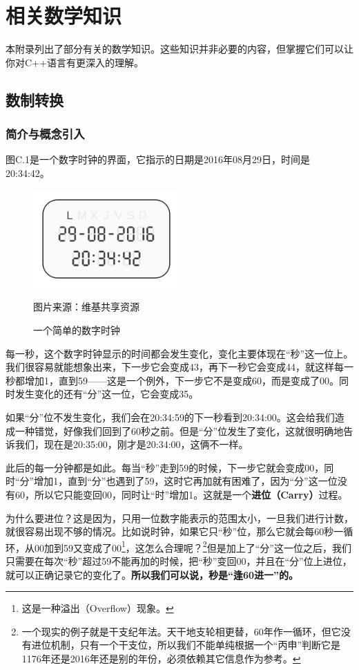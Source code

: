\chapter{相关数学知识}
本附录列出了部分有关的数学知识。这些知识并非必要的内容，但掌握它们可以让你对C++语言有更深入的理解。
\section{数制转换}
\subsection*{简介与概念引入}
图C.1是一个数字时钟的界面，它指示的日期是2016年08月29日，时间是20:34:42。\par
\begin{figure}[htbp]
    \centering
    \includegraphics[width=0.5\textwidth]{../images/other_parts/C_digital_clock.png}
    \caption{一个简单的数字时钟}
    \footnotesize{图片来源：维基共享资源}
\end{figure}
每一秒，这个数字时钟显示的时间都会发生变化，变化主要体现在``秒''这一位上。我们很容易就能想象出来，下一步它会变成43，再下一秒它会变成44，就这样每一秒都增加1，直到59——这是一个例外，下一步它不是变成60，而是变成了00。同时发生变化的还有``分''这一位，它会变成35。\par
如果``分''位不发生变化，我们会在20:34:59的下一秒看到20:34:00。这会给我们造成一种错觉，好像我们回到了60秒之前。但是``分''位发生了变化，这就很明确地告诉我们，现在是20:35:00，刚才是20:34:00，这俩不一样。\par
此后的每一分钟都是如此。每当``秒''走到59的时候，下一步它就会变成00，同时``分''增加1，直到``分''也遇到了59，这时它再加就有困难了，因为``分''这一位没有60，所以它只能变回00，同时让``时''增加1。这就是一个\textbf{进位（Carry）}过程。\par
为什么要进位？这是因为，只用一位数字能表示的范围太小，一旦我们进行计数，就很容易出现不够的情况。比如说时钟，如果它只``秒''位，那么它就会每60秒一循环，从00加到59又变成了00\footnote{这是一种溢出（Overflow）现象。}，这怎么合理呢？\footnote{一个现实的例子就是干支纪年法。天干地支轮相更替，60年作一循环，但它没有进位机制，只有一个干支位，所以我们不能单纯根据一个``丙申''判断它是1176年还是2016年还是别的年份，必须依赖其它信息作为参考。}但是加上了``分''这一位之后，我们只需要在每次``秒''超过59不能再加的时候，把``秒''变回00，并且在``分''位上进位，就可以正确记录它的变化了。\textbf{所以我们可以说，秒是``逢60进一''的。}\par
